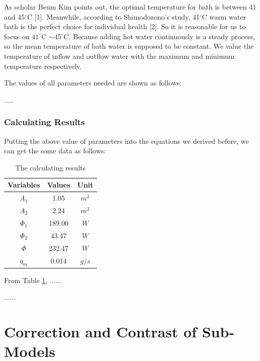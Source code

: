 \documentclass{mcmthesis}
\begin{document}
As scholar Beum Kim points out, the optimal temperature for bath is
between 41 and 45$^\circ$C [1]. Meanwhile, according to Shimodozono's study, 41$^\circ$C warm water bath is the perfect choice for individual health [2]. So it is reasonable for us to focus on $41^\circ$C $\sim 45^\circ$C. Because adding hot water continuously is a steady process, so the mean temperature of bath water is supposed to be constant. We value the temperature of inflow and outflow water with the maximum and minimum temperature respectively.

The values of all parameters needed are shown as follows:

.....

\subsubsection{Calculating Results}

Putting the above value of parameters into the equations we derived before, we can get the some data as follows:

\begin{table}[h]  %
\centering        %
\caption{The calculating results}  %
\vspace{0.15cm}
\label{tab2}                       %
\begin{tabular}{|c|c|c|}  %
\hline                    %
Variables & Values & Unit     \\ \hline  %
$A_1$     & 1.05   &   $m^2$  \\ \hline
$A_2$     & 2.24   &   $m^2$  \\ \hline
$\Phi_1$  & 189.00 &   $W$   \\ \hline
$\Phi_2$  & 43.47  &   $W$   \\ \hline
$\Phi$    & 232.47 &   $W$   \\ \hline
$q_m$     & 0.014  &   $g/s$ \\ \hline
\end{tabular}
\end{table}

From Table \ref{tab2}, ......

......

\section{Correction and Contrast of Sub-Models}
\end{document}

